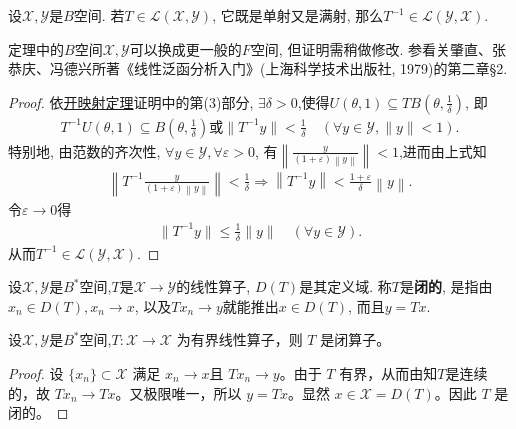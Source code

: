 \documentclass[../../main.tex]{subfiles}%
\begin{document}
\begin{theorem}[Banach逆算子定理]\label{theorem:泛函分析--Banach逆算子定理}
设$\mathscr{X},\mathscr{Y}$是$B$空间. 若$T\in\mathscr{L}(\mathscr{X},\mathscr{Y})$, 它既是单射又是满射, 那么$T^{-1}\in\mathscr{L}(\mathscr{Y},\mathscr{X})$.
\end{theorem}
\begin{remark}
定理中的$B$空间$\mathscr{X},\mathscr{Y}$可以换成更一般的$F$空间, 但证明需稍做修改. 参看关肇直、张恭庆、冯德兴所著《线性泛函分析入门》(上海科学技术出版社, 1979)的第二章§2.
\end{remark}
\begin{proof}

依\hyperref[theorem:泛函分析--开映射定理]{开映射定理}证明中的第(3)部分, $\exists \delta>0$,使得$U(\theta,1)\subseteq TB\left(\theta,\frac{1}{\delta}\right)$, 即
\begin{align*}
T^{-1}U(\theta ,1)\subseteq B\left( \theta ,\frac{1}{\delta} \right) \text{或}\parallel T^{-1}y\parallel <\frac{1}{\delta}\quad (\forall y\in \mathscr{Y} ,\parallel y\parallel <1).
\end{align*}
特别地, 由范数的齐次性, $\forall y\in\mathscr{Y},\forall\varepsilon>0$, 有$\left\| \frac{y}{\left( 1+\varepsilon \right) \left\| y \right\|} \right\| <1$,进而由上式知
\begin{align*}
\left\| T^{-1}\frac{y}{\left( 1+\varepsilon \right) \left\| y \right\|} \right\| <\frac{1}{\delta}\Longrightarrow \left\| T^{-1}y \right\| <\frac{1+\varepsilon}{\delta}\left\| y \right\| .
\end{align*}
令$\varepsilon\to0$得
\begin{align*}
\|T^{-1}y\|\leqslant\frac{1}{\delta}\|y\|\quad(\forall y\in\mathscr{Y}).
\end{align*}
从而$T^{-1}\in\mathscr{L}(\mathscr{Y},\mathscr{X})$.

\end{proof}


\begin{definition}
设$\mathscr{X},\mathscr{Y}$是$B^*$空间,$T$是$\mathscr{X}\to\mathscr{Y}$的线性算子, $D(T)$是其定义域. 称$T$是\textbf{闭的}, 是指由$x_n\in D(T),x_n\to x$, 以及$Tx_n\to y$就能推出$x\in D(T)$, 而且$y=Tx$.
\end{definition}

\begin{proposition}\label{proposition:有界线性算子必是闭的}
设$\mathscr{X},\mathscr{Y}$是$B^*$空间,$T: \mathscr{X} \to  \mathscr{X}$ 为有界线性算子，则 $T$ 是闭算子。
\end{proposition}
\begin{proof}

设 $\{x_n\} \subset \mathscr{X}$ 满足 $x_n \to x$且 $Tx_n \to y$。由于 $T$ 有界，从而由知$T$是连续的，故 $Tx_n \to Tx$。又极限唯一，所以 $y = Tx$。显然 $x \in \mathscr{X} = D(T)$。因此 $T$ 是闭的。
\end{proof}
\end{document}
